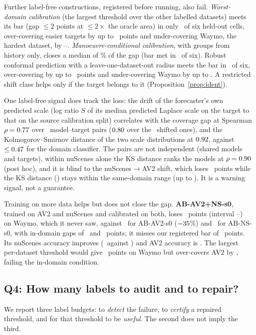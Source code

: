 Further label-free constructions, registered before running, also fail. \emph{Worst-domain calibration} (the largest threshold
over the other labelled datasets) meets its bar (gap $\le2$ points at $\le2\times$ the oracle area) in only \abAok\ of six
held-out cells, over-covering easier targets by up to \abEasyOverMax\ points and under-covering Waymo, the hardest dataset, by
\abWmGapMin--\abWmGapMax. \emph{Manoeuvre-conditional calibration}, with groups from history only, closes a median of \abBRedMed\%
of the gap (bar met in \abBok\ of six). Robust conformal prediction \cite{cauchois2024robust} with a leave-one-dataset-out
radius meets the bar in \robOk\ of six, over-covering by up to \robOverMax\ points and under-covering Waymo by up to \robUnderMax.
A restricted shift class helps only if the target belongs to it (Proposition~\ref{prop:ident}).

One label-free signal does track the loss: the drift of the forecaster's own predicted scale (log ratio $S$ of its median
predicted Laplace scale on the target to that on the source calibration split) correlates with the coverage gap at Spearman
$\rho=0.77$ over \monN\ model--target pairs ($0.80$ over the \monNShift\ shifted ones), and the Kolmogorov--Smirnov
distance of the two scale distributions at $0.92$, against $\le0.47$ for the domain classifier. The pairs are not
independent (shared models and targets), within nuScenes alone the KS distance ranks the models at $\rho=0.90$ (post
hoc), and it is blind to the nuScenes$\to$AV2 shift, which loses \monBlindGap\ points while the KS distance (\monBlindKS) stays
within the same-domain range (up to \monSameKSMax). It is a warning signal, not a guarantee.

Training on more data helps but does not close the gap. \textbf{AB-AV2+NS-s0}, trained on AV2 and nuScenes and calibrated on both,
loses \lFourWm\ points (interval \lFourWmLo--\lFourWmHi) on Waymo, which it never saw, against \lFourRefAv\ for AB-AV2-s0
($-35$\%) and \lFourRefNs\ for AB-NS-s0, with in-domain gaps of \lFourAv\ and \lFourNs\ points; it misses our registered
bar of \lFourBar\ points. Its nuScenes accuracy improves (\lFourAdeNs\ against \minADESixConfRev) and AV2 accuracy is \lFourAdeAv.
The largest per-dataset threshold would give \lFourWd\ points on Waymo but over-covers AV2 by \lFourWdAv, failing the in-domain condition.

\subsection{Q4: How many labels to audit and to repair?}\label{sec:repair-scene}
We report three label budgets: to \emph{detect} the failure, to \emph{certify} a repaired threshold, and for that
threshold to be \emph{useful}. The second does not imply the third.


